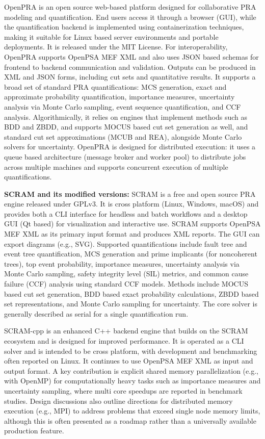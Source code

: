 OpenPRA \cite{openpra_2023} is an open source web-based platform designed for collaborative PRA modeling and quantification. End users access it through a browser (GUI), while the quantification backend is implemented using containerization techniques, making it suitable for Linux based server environments and portable deployments. It is released under the MIT License. For interoperability, OpenPRA supports OpenPSA MEF XML and also uses JSON based schemas for frontend to backend communication and validation. Outputs can be produced in XML and JSON forms, including cut sets and quantitative results. It supports a broad set of standard PRA quantifications: MCS generation, exact and approximate probability quantification, importance measures, uncertainty analysis via Monte Carlo sampling, event sequence quantification, and CCF analysis. Algorithmically, it relies on engines that implement methods such as BDD and ZBDD, and supports MOCUS based cut set generation as well, and standard cut set approximations (MCUB and REA), alongside Monte Carlo solvers for uncertainty. OpenPRA is designed for distributed execution: it uses a queue based architecture (message broker and worker pool) to distribute jobs across multiple machines and supports concurrent execution of multiple quantifications.

\textbf{SCRAM and its modified versions: }
SCRAM \cite{rakhimov_scram_2022} is a free and open source PRA engine released under GPLv3. It is cross platform (Linux, Windows, macOS) and provides both a CLI interface for headless and batch workflows and a desktop GUI (Qt based) for visualization and interactive use. SCRAM supports OpenPSA MEF XML as its primary input format and produces XML reports. The GUI can export diagrams (e.g., SVG). Supported quantifications include fault tree and event tree quantification, MCS generation and prime implicants (for noncoherent trees), top event probability, importance measures, uncertainty analysis via Monte Carlo sampling, safety integrity level (SIL) metrics, and common cause failure (CCF) analysis using standard CCF models. Methods include MOCUS based cut set generation, BDD based exact probability calculations, ZBDD based set representations, and Monte Carlo sampling for uncertainty. The core solver is generally described as serial for a single quantification run.

SCRAM-cpp \cite{scramcpp_2026} is an enhanced C++ backend engine that builds on the SCRAM ecosystem and is designed for improved performance. It is operated as a CLI solver and is intended to be cross platform, with development and benchmarking often reported on Linux. It continues to use OpenPSA MEF XML as input and output format. A key contribution is explicit shared memory parallelization (e.g., with OpenMP) for computationally heavy tasks such as importance measures and uncertainty sampling, where multi core speedups are reported in benchmark studies. Design discussions also outline directions for distributed memory execution (e.g., MPI) to address problems that exceed single node memory limits, although this is often presented as a roadmap rather than a universally available production feature.


